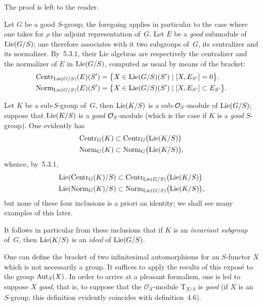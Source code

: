 The proof is left to the reader.

\label{II.5.3.2}
Let \(G\) be a good \(S\)-group; the foregoing applies in particular to the
case where one takes for \(\rho\) the adjoint representation of~\(G\). Let
\(E\) be a \emph{good}%
{\renewcommand{\thefootnote}{(99)}}
submodule of \(\operatorname{Lie}(G/S)\); one therefore associates with it two subgroups
of~\(G\), its centralizer and its normalizer. By~5.3.1, their Lie algebras
are respectively the centralizer and the normalizer of \(E\) in
\(\operatorname{Lie}(G/S)\), computed as usual by means of the bracket:
\begin{align*}
\operatorname{Centr}_{\operatorname{Lie}(G/S)}(E)(S')
&=
\bigl\{X\in\operatorname{Lie}(G/S)(S')\mid [X,E_{S'}]=0\bigr\}.\\
\operatorname{Norm}_{\operatorname{Lie}(G/S)}(E)(S')
&=
\bigl\{X\in\operatorname{Lie}(G/S)(S')\mid [X,E_{S'}]\subset E_{S'}\bigr\}.
\end{align*}

\label{II.5.3.3}
Let \(K\) be a sub-\(S\)-group of~\(G\), then \(\operatorname{Lie}(K/S)\) is a
sub-\(\mathcal{O}_S\)-module of \(\operatorname{Lie}(G/S)\); suppose that \(\operatorname{Lie}(K/S)\) is a
\emph{good} \(\mathcal{O}_S\)-module%
{\renewcommand{\thefootnote}{(99)}\ndemark}
(which is the case if \(K\) is a \emph{good} \(S\)-group). One evidently has
\begin{align*}
\operatorname{Centr}_G(K)&\subset\operatorname{Centr}_G\bigl(\operatorname{Lie}(K/S)\bigr)\\
\operatorname{Norm}_G(K)&\subset\operatorname{Norm}_G\bigl(\operatorname{Lie}(K/S)\bigr),
\end{align*}
whence, by~5.3.1,
\begin{align*}
\operatorname{Lie}(\operatorname{Centr}_G(K)/S)
  &\subset\operatorname{Centr}_{\operatorname{Lie}(G/S)}\bigl(\operatorname{Lie}(K/S)\bigr)\\
\operatorname{Lie}(\operatorname{Norm}_G(K)/S)
  &\subset\operatorname{Norm}_{\operatorname{Lie}(G/S)}\bigl(\operatorname{Lie}(K/S)\bigr),
\end{align*}
but none of these four inclusions is a priori an identity; we shall see
many examples of this later.

It follows in particular from these inclusions that if \(K\) is an
\emph{invariant subgroup} of~\(G\), then \(\operatorname{Lie}(K/S)\) is an \emph{ideal}
of \(\operatorname{Lie}(G/S)\).

\label{II.sec.6}

\label{II.6.1}
One can define the bracket of two infinitesimal automorphisms for an
\(S\)-functor \(X\) which is not necessarily a group. It suffices to apply
the results of this exposé to the group \(\operatorname{Aut}_S(X)\). In order to arrive
at a pleasant formalism, one is led to suppose \(X\) \emph{good}, that is,
to suppose that the \(\mathcal{O}_X\)-module \(\mathrm{T}_{X/S}\) is
\emph{good} (if \(X\) is an \(S\)-group, this definition evidently coincides
with definition~4.6).

